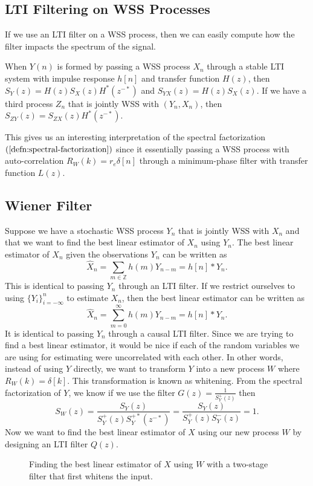 \subsection{LTI Filtering on WSS Processes}
If we use an LTI filter on a WSS process, then we can easily compute how the filter impacts the spectrum of the signal.
\begin{theorem}
	When $Y(n)$ is formed by passing a WSS process $X_n$ through a stable LTI system with impulse response $h[n]$ and transfer function $H(z)$, then $S_Y(z) = H(z)S_X(z)H^*(z^{-*})$ and $S_{YX}(z) = H(z)S_X(z)$.
	If we have a third process $Z_n$ that is jointly WSS with $(Y_n, X_n)$, then $S_{ZY}(z) = S_{ZX}(z)H^*(z^{-*})$.
	\label{thm:lti-process}
\end{theorem}
This gives us an interesting interpretation of the spectral factorization $(\cref{defn:spectral-factorization})$ since it essentially passing a WSS process with auto-correlation $R_W(k) = r_e\delta[n]$ through a minimum-phase filter with transfer function $L(z)$.
\subsection{Wiener Filter}
Suppose we have a stochastic WSS process $Y_n$ that is jointly WSS with $X_n$ and that we want to find the best linear estimator of $X_n$ using $Y_n$.
The best linear estimator of $X_n$ given the observations $Y_n$ can be written as \[
	\hat{X}_n = \sum_{m\in\mathbb{Z}}h(m)Y_{n-m} = h[n] * Y_n.
\]
This is identical to passing $Y_n$ through an LTI filter.
If we restrict ourselves to using $\{Y_i\}_{i=-\infty}^{n}$ to estimate $X_n$, then the best linear estimator can be written as \[
	\hat{X}_n = \sum_{m=0}^\infty h(m)Y_{n-m} = h[n] * Y_n.
\]
It is identical to passing $Y_n$ through a causal LTI filter.
Since we are trying to find a best linear estimator, it would be nice if each of the random variables we are using for estimating were uncorrelated with each other.
In other words, instead of using $Y$ directly, we want to transform $Y$ into a new process $W$ where $R_W(k) = \delta[k]$.
This transformation is known as whitening.
From the spectral factorization of $Y$, we know if we use the filter $G(z) =\frac{1}{S_Y^+(z)}$ then \[
	S_W(z) = \frac{S_Y(z)}{S_Y^+(z)S_Y^{+*}(z^{-*})} = \frac{S_Y(z)}{S_Y^+(z)S_Y^-(z)} = 1.
\]
Now we want to find the best linear estimator of $X$ using our new process $W$ by designing an LTI filter $Q(z)$.
\begin{gitbook-image}
\begin{figure}[!h]
  \centering
	\caption{Finding the best linear estimator of $X$ using $W$ with a two-stage filter that first whitens the input.}
  \label{fig:wiener-filter}
\end{figure}
\end{gitbook-image}
